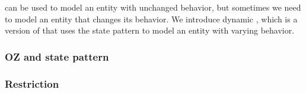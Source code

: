 \oz{} can be used to model an entity with unchanged behavior, but sometimes we need to model an entity that changes its behavior. We introduce dynamic \oz{}, which is a version of \oz{} that uses the state pattern to model an entity with varying behavior.
\subsubsection{OZ and state pattern}


\subsubsection{Restriction}
